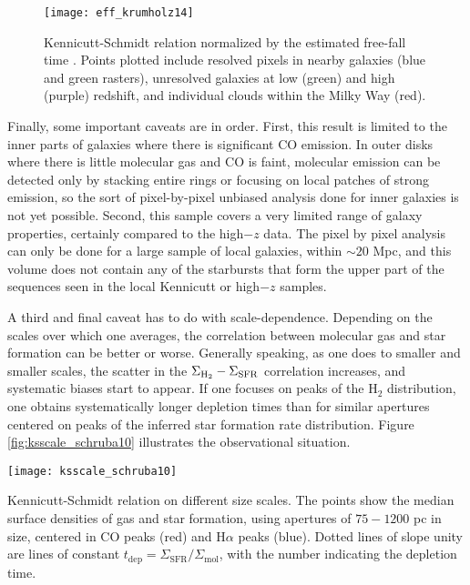 \begin{figure}
\texttt{[image: eff\_krumholz14]}
\caption[Kennicutt-Schmidt relation normalized by the free-fall time]{
\label{fig:ks_krumholz14}
Kennicutt-Schmidt relation normalized by the estimated free-fall time \citet{krumholz14c}. Points plotted include resolved pixels in nearby galaxies (blue and green rasters), unresolved galaxies at low (green) and high (purple) redshift, and individual clouds within the Milky Way (red).
}
\end{figure}

Finally, some important caveats are in order. First, this result is limited to the inner parts of galaxies where there is significant CO emission. In outer disks where there is little molecular gas and CO is faint, molecular emission can be detected only by stacking entire rings or focusing on local patches of strong emission, so the sort of pixel-by-pixel unbiased analysis done for inner galaxies is not yet possible. Second, this sample covers a very limited range of galaxy properties, certainly compared to the high$-z$ data. The pixel by pixel analysis can only be done for a large sample of local galaxies, within $\sim 20$ Mpc, and this volume does not contain any of the starbursts that form the upper part of the sequences seen in the local Kennicutt or high$-z$ samples.

A third and final caveat has to do with scale-dependence. Depending on the scales over which one averages, the correlation between molecular gas and star formation can be better or worse. Generally speaking, as one does to smaller and smaller scales, the scatter in the $\Sigma_{\rm H_2} - \Sigma_{\rm SFR}$ correlation increases, and systematic biases start to appear. If one focuses on peaks of the H$_2$ distribution, one obtains systematically longer depletion times than for similar apertures centered on peaks of the inferred star formation rate distribution. Figure \ref{fig:ksscale_schruba10} illustrates the observational situation.
\begin{marginfigure}
\texttt{[image: ksscale\_schruba10]}
\caption[Kennicutt-Schmidt relation averaged on different size scales in M33]{
\label{fig:ksscale_schruba10}
Kennicutt-Schmidt relation on different size scales. The points show the median surface densities of gas and star formation, using apertures of $75-1200$ pc in size, centered in CO peaks (red) and H$\alpha$ peaks (blue). Dotted lines of slope unity are lines of constant $t_{\mathrm{dep}} = \Sigma_{\mathrm{SFR}} / \Sigma_{\mathrm{mol}}$, with the number indicating the depletion time.
}
\end{marginfigure}

